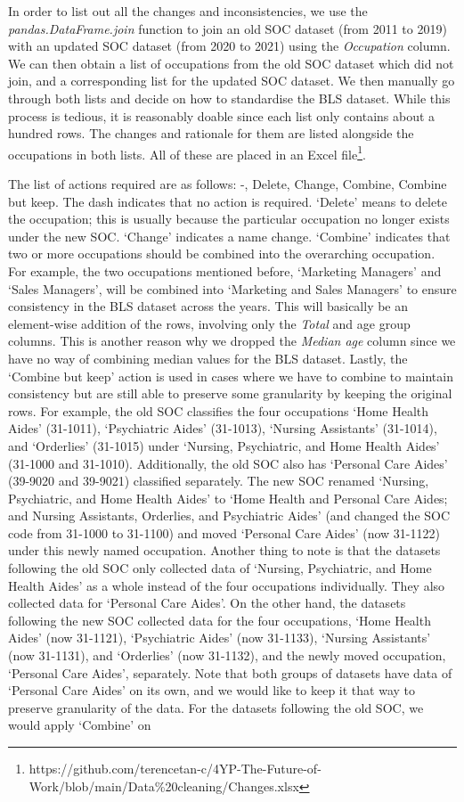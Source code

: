 \documentclass[11pt]{article}
\begin{document}
In order to list out all the changes and inconsistencies, we use the \emph{pandas.DataFrame.join} function to join an old SOC dataset (from 2011 to 2019) with an updated SOC dataset (from 2020 to 2021) using the \emph{Occupation} column. We can then obtain a list of occupations from the old SOC dataset which did not join, and a corresponding list for the updated SOC dataset. We then manually go through both lists and decide on how to standardise the BLS dataset. While this process is tedious, it is reasonably doable since each list only contains about a hundred rows. The changes and rationale for them are listed alongside the occupations in both lists. All of these are placed in an Excel file\footnote{https://github.com/terencetan-c/4YP-The-Future-of-Work/blob/main/Data\%20cleaning/Changes.xlsx}.

The list of actions required are as follows: -, Delete, Change, Combine, Combine but keep. The dash indicates that no action is required. `Delete' means to delete the occupation; this is usually because the particular occupation no longer exists under the new SOC. `Change' indicates a name change. `Combine' indicates that two or more occupations should be combined into the overarching occupation. For example, the two occupations mentioned before, `Marketing Managers' and `Sales Managers', will be combined into `Marketing and Sales Managers' to ensure consistency in the BLS dataset across the years. This will basically be an element-wise addition of the rows, involving only the \emph{Total} and age group columns. This is another reason why we dropped the \emph{Median age} column since we have no way of combining median values for the BLS dataset. Lastly, the `Combine but keep' action is used in cases where we have to combine to maintain consistency but are still able to preserve some granularity by keeping the original rows. For example, the old SOC classifies the four occupations `Home Health Aides' (31-1011), `Psychiatric Aides' (31-1013), `Nursing Assistants' (31-1014), and `Orderlies' (31-1015) under `Nursing, Psychiatric, and Home Health Aides' (31-1000 and 31-1010). Additionally, the old SOC also has `Personal Care Aides' (39-9020 and 39-9021) classified separately. The new SOC renamed `Nursing, Psychiatric, and Home Health Aides' to `Home Health and Personal Care Aides; and Nursing Assistants, Orderlies, and Psychiatric Aides' (and changed the SOC code from 31-1000 to 31-1100) and moved `Personal Care Aides' (now 31-1122) under this newly named occupation. Another thing to note is that the datasets following the old SOC only collected data of `Nursing, Psychiatric, and Home Health Aides' as a whole instead of the four occupations individually. They also collected data for `Personal Care Aides'. On the other hand, the datasets following the new SOC collected data for the four occupations, `Home Health Aides' (now 31-1121), `Psychiatric Aides' (now 31-1133), `Nursing Assistants' (now 31-1131), and `Orderlies' (now 31-1132), and the newly moved occupation, `Personal Care Aides', separately. Note that both groups of datasets have data of `Personal Care Aides' on its own, and we would like to keep it that way to preserve granularity of the data. For the datasets following the old SOC, we would apply `Combine' on 
\end{document}
